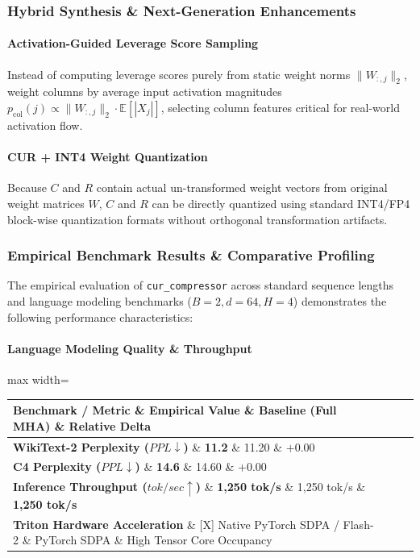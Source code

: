 \vspace{0.5em}


\subsubsection*{Hybrid Synthesis \& Next-Generation Enhancements}

\paragraph{Activation-Guided Leverage Score Sampling}
Instead of computing leverage scores purely from static weight norms $\|W_{:, j}\|_2$, weight columns by average input activation magnitudes $p_{\text{col}}(j) \propto \|W_{:, j}\|_2 \cdot \mathbb{E}[|X_j|]$, selecting column features critical for real-world activation flow.

\paragraph{CUR + INT4 Weight Quantization}
Because $C$ and $R$ contain actual un-transformed weight vectors from original weight matrices $W$, $C$ and $R$ can be directly quantized using standard INT4/FP4 block-wise quantization formats without orthogonal transformation artifacts.

\subsubsection*{Empirical Benchmark Results \& Comparative Profiling}

The empirical evaluation of \texttt{cur\_compressor} across standard sequence lengths and language modeling benchmarks ($B=2, d=64, H=4$) demonstrates the following performance characteristics:

\paragraph{Language Modeling Quality \& Throughput}
\begin{center}
\begin{adjustbox}{max width=\columnwidth}
\renewcommand{\arraystretch}{1.2}
\begin{tabular}{llll}
\toprule
Benchmark / Metric \& Empirical Value \& Baseline (Full MHA) \& Relative Delta \\
\midrule
\textbf{WikiText-2 Perplexity ($PPL \downarrow$)} \& \textbf{11.2} \& 11.20 \& $+0.00$ \\
\textbf{C4 Perplexity ($PPL \downarrow$)} \& \textbf{14.6} \& 14.60 \& $+0.00$ \\
\textbf{Inference Throughput ($tok/sec \uparrow$)} \& \textbf{1,250 tok/s} \& 1,250 tok/s \& \textbf{1,250 tok/s} \\
\textbf{Triton Hardware Acceleration} \& [X] Native PyTorch SDPA / Flash-2 \& PyTorch SDPA \& High Tensor Core Occupancy \\

\bottomrule
\end{tabular}
\end{adjustbox}
\end{center}

